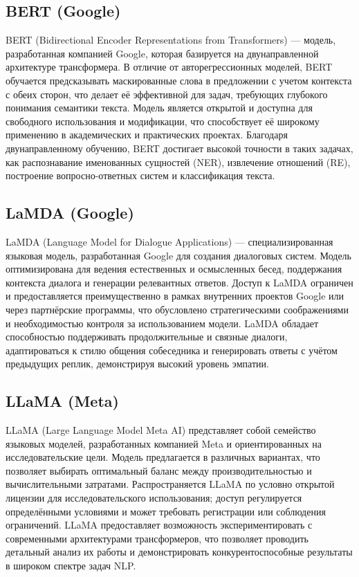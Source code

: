 \subsection{BERT (Google)}

BERT (Bidirectional Encoder Representations from Transformers) — модель, разработанная компанией Google, которая базируется на двунаправленной архитектуре трансформера. В отличие от авторегрессионных моделей, BERT обучается предсказывать маскированные слова в предложении с учетом контекста с обеих сторон, что делает её эффективной для задач, требующих глубокого понимания семантики текста. Модель является открытой и доступна для свободного использования и модификации, что способствует её широкому применению в академических и практических проектах. Благодаря двунаправленному обучению, BERT достигает высокой точности в таких задачах, как распознавание именованных сущностей (NER), извлечение отношений (RE), построение вопросно-ответных систем и классификация текста.

\subsection{LaMDA (Google)}

LaMDA (Language Model for Dialogue Applications) — специализированная языковая модель, разработанная Google для создания диалоговых систем. Модель оптимизирована для ведения естественных и осмысленных бесед, поддержания контекста диалога и генерации релевантных ответов. Доступ к LaMDA ограничен и предоставляется преимущественно в рамках внутренних проектов Google или через партнёрские программы, что обусловлено стратегическими соображениями и необходимостью контроля за использованием модели. LaMDA обладает способностью поддерживать продолжительные и связные диалоги, адаптироваться к стилю общения собеседника и генерировать ответы с учётом предыдущих реплик, демонстрируя высокий уровень эмпатии.

\subsection{LLaMA (Meta)}

LLaMA (Large Language Model Meta AI) представляет собой семейство языковых моделей, разработанных компанией Meta и ориентированных на исследовательские цели. Модель предлагается в различных вариантах, что позволяет выбирать оптимальный баланс между производительностью и вычислительными затратами. Распространяется LLaMA по условно открытой лицензии для исследовательского использования; доступ регулируется определёнными условиями и может требовать регистрации или соблюдения ограничений. LLaMA предоставляет возможность экспериментировать с современными архитектурами трансформеров, что позволяет проводить детальный анализ их работы и демонстрировать конкурентоспособные результаты в широком спектре задач NLP.

